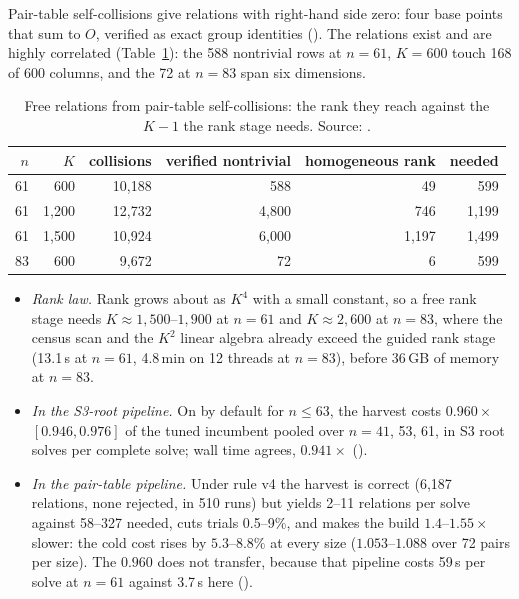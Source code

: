 Pair-table self-collisions give relations with right-hand side zero: four
base points that sum to $O$, verified as exact group identities
(). The relations exist and
are highly correlated (Table~\ref{tab:kc-free}): the 588 nontrivial rows at
$n=61$, $K=600$ touch 168 of 600 columns, and the 72 at $n=83$ span six
dimensions.

\begin{table}[t]
\centering\small
\begin{tabular}{@{}rrrrrr@{}}
\toprule
$n$ & $K$ & collisions & verified nontrivial & homogeneous rank & needed \\
\midrule
61 & 600 & 10{,}188 & 588 & 49 & 599 \\
61 & 1{,}200 & 12{,}732 & 4{,}800 & 746 & 1{,}199 \\
61 & 1{,}500 & 10{,}924 & 6{,}000 & 1{,}197 & 1{,}499 \\
83 & 600 & 9{,}672 & 72 & 6 & 599 \\
\bottomrule
\end{tabular}
\caption[]{Free relations from pair-table self-collisions: the rank they
reach against the $K-1$ the rank stage needs. Source:
.}
\label{tab:kc-free}
\end{table}

\begin{itemize}
\item \emph{Rank law.} Rank grows about as $K^4$ with a small constant, so a
  free rank stage needs $K\approx1{,}500$--$1{,}900$ at $n=61$ and
  $K\approx2{,}600$ at $n=83$, where the census scan and the $K^2$ linear
  algebra already exceed the guided rank stage (13.1\,s at $n=61$, 4.8\,min
  on 12 threads at $n=83$), before 36\,GB of memory at $n=83$.
\item \emph{In the S3-root pipeline.} On by default for $n\le63$, the
  harvest costs $0.960\times$ $[0.946,0.976]$ of the tuned incumbent pooled
  over $n=41$, 53, 61, in S3 root solves per complete solve; wall time
  agrees, $0.941\times$
  ().
\item \emph{In the pair-table pipeline.} Under rule v4 the harvest is
  correct (6{,}187 relations, none rejected, in 510 runs) but yields 2--11
  relations per solve against 58--327 needed, cuts trials 0.5--9\%, and makes
  the build $1.4$--$1.55\times$ slower: the cold cost rises by $5.3$--$8.8\%$
  at every size ($1.053$--$1.088$ over 72 pairs per size). The $0.960$ does
  not transfer, because that pipeline costs 59\,s per solve at $n=61$
  against 3.7\,s here ().
\end{itemize}

